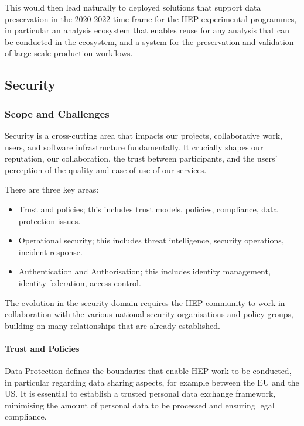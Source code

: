 This would then lead naturally to deployed solutions that support data
preservation in the 2020-2022 time frame for the HEP experimental
programmes, in particular an analysis ecosystem that enables reuse for
any analysis that can be conducted in the ecosystem, and a system for
the preservation and validation of large-scale production workflows.

\hypertarget{security}{%
\subsection{Security}\label{security}}

\subsubsection*{Scope and Challenges}

Security is a cross-cutting area that impacts our projects,
collaborative work, users, and software infrastructure fundamentally. It
crucially shapes our reputation, our collaboration, the trust between
participants, and the users' perception of the quality and ease of use
of our services.

There are three key areas:

\begin{itemize}
\item
  Trust and policies; this includes trust models, policies, compliance,
  data protection issues.
\item
  Operational security; this includes threat intelligence, security
  operations, incident response.
\item
  Authentication and Authorisation; this includes identity management,
  identity federation, access control.
\end{itemize}

The evolution in the security domain requires the HEP community to work in
collaboration with the various national security organisations and
policy groups, building on many relationships that are already
established.

\paragraph{Trust and Policies}

Data Protection defines the boundaries that enable HEP work to be
conducted, in particular regarding data sharing aspects, for example
between the EU and the US. It is essential to establish a trusted
personal data exchange framework, minimising the amount of personal data
to be processed and ensuring legal compliance.


